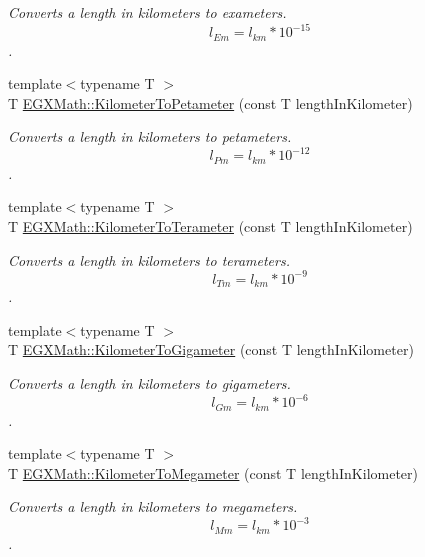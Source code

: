 \begin{DoxyCompactItemize}
\begin{DoxyCompactList}\small\item\em Converts a length in kilometers to exameters. \[ l_{Em}=l_{km} * 10^{-15} \]. \end{DoxyCompactList}\item 
{\footnotesize template$<$typename T $>$ }\\T \mbox{\hyperlink{group___e_g_x_math-_conversions-_length_conversions-_kilometer-_s_i_ga79a0e22448e08eeb755577316635058a}{E\+G\+X\+Math\+::\+Kilometer\+To\+Petameter}} (const T length\+In\+Kilometer)
\begin{DoxyCompactList}\small\item\em Converts a length in kilometers to petameters. \[ l_{Pm}=l_{km} * 10^{-12} \]. \end{DoxyCompactList}\item 
{\footnotesize template$<$typename T $>$ }\\T \mbox{\hyperlink{group___e_g_x_math-_conversions-_length_conversions-_kilometer-_s_i_gadc147bd94e976f0577e7ca544ed81bf9}{E\+G\+X\+Math\+::\+Kilometer\+To\+Terameter}} (const T length\+In\+Kilometer)
\begin{DoxyCompactList}\small\item\em Converts a length in kilometers to terameters. \[ l_{Tm}=l_{km} * 10^{-9} \]. \end{DoxyCompactList}\item 
{\footnotesize template$<$typename T $>$ }\\T \mbox{\hyperlink{group___e_g_x_math-_conversions-_length_conversions-_kilometer-_s_i_gafab6496ea68973d69b855d445c8a62a8}{E\+G\+X\+Math\+::\+Kilometer\+To\+Gigameter}} (const T length\+In\+Kilometer)
\begin{DoxyCompactList}\small\item\em Converts a length in kilometers to gigameters. \[ l_{Gm}=l_{km} * 10^{-6} \]. \end{DoxyCompactList}\item 
{\footnotesize template$<$typename T $>$ }\\T \mbox{\hyperlink{group___e_g_x_math-_conversions-_length_conversions-_kilometer-_s_i_gacfeaef9cf345a9907addb7989eb11034}{E\+G\+X\+Math\+::\+Kilometer\+To\+Megameter}} (const T length\+In\+Kilometer)
\begin{DoxyCompactList}\small\item\em Converts a length in kilometers to megameters. \[ l_{Mm}=l_{km} * 10^{-3} \]. \end{DoxyCompactList}\item 

\end{DoxyCompactItemize}

